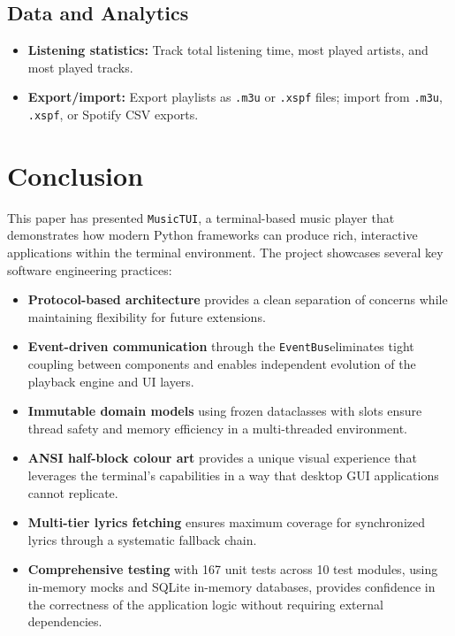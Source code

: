 \documentclass[a4paper,11pt,twoside]{article}
\newcommand{\musictui}{\texttt{MusicTUI}}
\newcommand{\eventbus}{\texttt{EventBus}}
\begin{document}
\subsection{Data and Analytics}
\begin{itemize}
    \item \textbf{Listening statistics:} Track total listening time, most
          played artists, and most played tracks.
    \item \textbf{Export/import:} Export playlists as \texttt{.m3u} or
          \texttt{.xspf} files; import from \texttt{.m3u}, \texttt{.xspf},
          or Spotify CSV exports.
\end{itemize}

\section{Conclusion}

This paper has presented \musictui, a terminal-based music player that
demonstrates how modern Python frameworks can produce rich, interactive
applications within the terminal environment. The project showcases several
key software engineering practices:

\begin{itemize}
    \item \textbf{Protocol-based architecture} provides a clean separation
          of concerns while maintaining flexibility for future extensions.
    \item \textbf{Event-driven communication} through the \eventbus eliminates
          tight coupling between components and enables independent evolution
          of the playback engine and UI layers.
    \item \textbf{Immutable domain models} using frozen dataclasses with
          slots ensure thread safety and memory efficiency in a
          multi-threaded environment.
    \item \textbf{ANSI half-block colour art} provides a unique visual
          experience that leverages the terminal's capabilities in a way
          that desktop GUI applications cannot replicate.
    \item \textbf{Multi-tier lyrics fetching} ensures maximum coverage for
          synchronized lyrics through a systematic fallback chain.
    \item \textbf{Comprehensive testing} with 167 unit tests across 10 test
          modules, using in-memory mocks and SQLite in-memory databases,
          provides confidence in the correctness of the application logic
          without requiring external dependencies.
\end{itemize}
\end{document}
